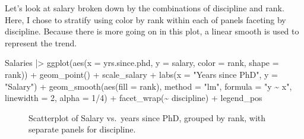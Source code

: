 \documentclass[
  letterpaper,
  10pt,
  krantz2]{krantz}
\makeatletter
\newenvironment{Shaded}{\begin{snugshade}}{\end{snugshade}}
\newcommand{\AttributeTok}[1]{\textcolor[rgb]{0.40,0.45,0.13}{#1}}
\newcommand{\DecValTok}[1]{\textcolor[rgb]{0.68,0.00,0.00}{#1}}
\newcommand{\FunctionTok}[1]{\textcolor[rgb]{0.28,0.35,0.67}{#1}}
\newcommand{\NormalTok}[1]{\textcolor[rgb]{0.00,0.23,0.31}{#1}}
\newcommand{\SpecialCharTok}[1]{\textcolor[rgb]{0.37,0.37,0.37}{#1}}
\newcommand{\StringTok}[1]{\textcolor[rgb]{0.13,0.47,0.30}{#1}}
\newenvironment{kframe}{%
  \medskip{}
  \setlength{\fboxsep}{.8em}
  \def\at@end@of@kframe{}%
  \ifinner\ifhmode%
  \def\at@end@of@kframe{\end{minipage}}%
  \begin{minipage}{\columnwidth}%
  \fi\fi%
  \def\FrameCommand##1{\hskip\@totalleftmargin \hskip-\fboxsep
  \colorbox{shadecolor}{##1}\hskip-\fboxsep
      \hskip-\linewidth \hskip-\@totalleftmargin \hskip\columnwidth}%
  \MakeFramed {\advance\hsize-\width
    \@totalleftmargin\z@ \linewidth\hsize
    \@setminipage}}%
{\par\unskip\endMakeFramed%
  \at@end@of@kframe}
\renewenvironment{Shaded}{\begin{kframe}}{\end{kframe}}
\makeatother
\begin{document}
Let's look at salary broken down by the combinations of discipline and
rank. Here, I chose to stratify using color by rank within each of
panels faceting by discipline. Because there is more going on in this
plot, a linear smooth is used to represent the trend.

\begin{Shaded}
\begin{Highlighting}[]
\NormalTok{Salaries }\SpecialCharTok{|\textgreater{}}
  \FunctionTok{ggplot}\NormalTok{(}\FunctionTok{aes}\NormalTok{(}\AttributeTok{x =}\NormalTok{ yrs.since.phd, }\AttributeTok{y =}\NormalTok{ salary, }
             \AttributeTok{color =}\NormalTok{ rank, }\AttributeTok{shape =}\NormalTok{ rank)) }\SpecialCharTok{+}
  \FunctionTok{geom\_point}\NormalTok{() }\SpecialCharTok{+}
\NormalTok{  scale\_salary }\SpecialCharTok{+}
  \FunctionTok{labs}\NormalTok{(}\AttributeTok{x =} \StringTok{"Years since PhD"}\NormalTok{,}
       \AttributeTok{y =} \StringTok{"Salary"}\NormalTok{) }\SpecialCharTok{+}
  \FunctionTok{geom\_smooth}\NormalTok{(}\FunctionTok{aes}\NormalTok{(}\AttributeTok{fill =}\NormalTok{ rank),}
              \AttributeTok{method =} \StringTok{"lm"}\NormalTok{, }\AttributeTok{formula =} \StringTok{"y \textasciitilde{} x"}\NormalTok{, }
              \AttributeTok{linewidth =} \DecValTok{2}\NormalTok{, }\AttributeTok{alpha =} \DecValTok{1}\SpecialCharTok{/}\DecValTok{4}\NormalTok{) }\SpecialCharTok{+}
  \FunctionTok{facet\_wrap}\NormalTok{(}\SpecialCharTok{\textasciitilde{}}\NormalTok{ discipline) }\SpecialCharTok{+}
\NormalTok{  legend\_pos}
\end{Highlighting}
\end{Shaded}

\begin{figure}[H]


\caption{\label{fig-Salaries-faceted}Scatterplot of Salary vs.~years
since PhD, grouped by rank, with separate panels for discipline.}

\end{figure}%
\end{document}
